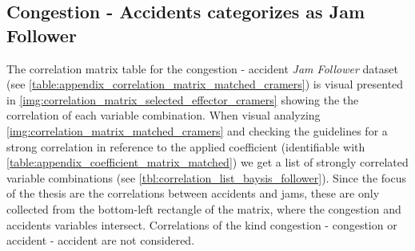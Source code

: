 \subsection{Congestion - Accidents categorizes as Jam Follower}
\label{analysis_processing_correlation_baysis_follower}
The correlation matrix table for the congestion - accident \textit{Jam Follower} dataset (see \cref{table:appendix_correlation_matrix_matched_cramers}) is visual presented in \cref{img:correlation_matrix_selected_effector_cramers} showing the the correlation of each variable combination. When visual analyzing \cref{img:correlation_matrix_matched_cramers} and checking the guidelines for a strong correlation in reference to the applied coefficient (identifiable with \cref{table:appendix_coefficient_matrix_matched}) we get a list of strongly correlated variable combinations (see \cref{tbl:correlation_list_baysis_follower}). Since the focus of the thesis are the correlations between accidents and jams, these are only collected from the bottom-left rectangle of the matrix, where the congestion and accidents variables intersect. Correlations of the kind congestion - congestion or accident - accident are not considered.
